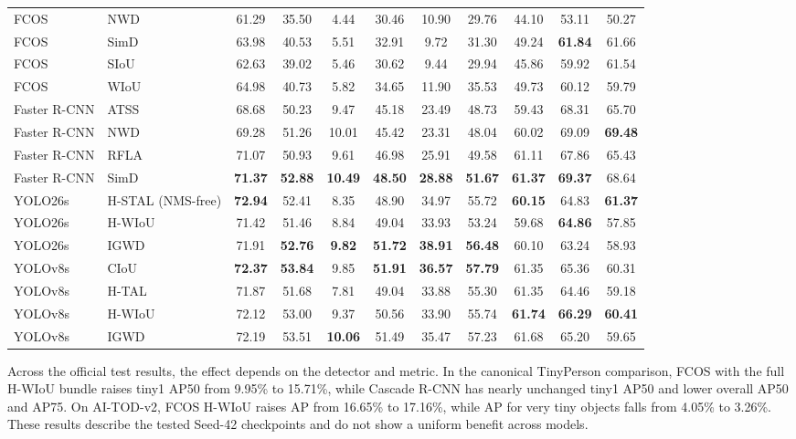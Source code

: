 \documentclass[11pt,a4paper]{article}
\providecommand{\midrule}{\hline}
\providecommand{\bottomrule}{\hline}
\begin{document}
\begin{table}[t]
{\begin{tabular}{llccccccccc}
    FCOS & NWD  & 61.29 & 35.50 & 4.44 & 30.46 & 10.90 & 29.76 & 44.10 & 53.11 & 50.27\\
    FCOS & SimD  & 63.98 & 40.53 & 5.51 & 32.91 & 9.72 & 31.30 & 49.24 & \textbf{61.84} & 61.66\\
    FCOS & SIoU  & 62.63 & 39.02 & 5.46 & 30.62 & 9.44 & 29.94 & 45.86 & 59.92 & 61.54\\
    FCOS & WIoU  & 64.98 & 40.73 & 5.82 & 34.65 & 11.90 & 35.53 & 49.73 & 60.12 & 59.79\\
    \midrule
    Faster R-CNN & ATSS  & 68.68 & 50.23 & 9.47 & 45.18 & 23.49 & 48.73 & 59.43 & 68.31 & 65.70\\
    Faster R-CNN & NWD  & 69.28 & 51.26 & 10.01 & 45.42 & 23.31 & 48.04 & 60.02 & 69.09 & \textbf{69.48}\\
    Faster R-CNN & RFLA  & 71.07 & 50.93 & 9.61 & 46.98 & 25.91 & 49.58 & 61.11 & 67.86 & 65.43\\
    Faster R-CNN & SimD  & \textbf{71.37} & \textbf{52.88} & \textbf{10.49} & \textbf{48.50} & \textbf{28.88} & \textbf{51.67} & \textbf{61.37} & \textbf{69.37} & 68.64\\
    \midrule
    YOLO26s & H-STAL (NMS-free)  & \textbf{72.94} & 52.41 & 8.35 & 48.90 & 34.97 & 55.72 & \textbf{60.15} & 64.83 & \textbf{61.37}\\
    YOLO26s & H-WIoU  & 71.42 & 51.46 & 8.84 & 49.04 & 33.93 & 53.24 & 59.68 & \textbf{64.86} & 57.85\\
    YOLO26s & IGWD  & 71.91 & \textbf{52.76} & \textbf{9.82} & \textbf{51.72} & \textbf{38.91} & \textbf{56.48} & 60.10 & 63.24 & 58.93\\
    \midrule
    YOLOv8s & CIoU  & \textbf{72.37} & \textbf{53.84} & 9.85 & \textbf{51.91} & \textbf{36.57} & \textbf{57.79} & 61.35 & 65.36 & 60.31\\
    YOLOv8s & H-TAL  & 71.87 & 51.68 & 7.81 & 49.04 & 33.88 & 55.30 & 61.35 & 64.46 & 59.18\\
    YOLOv8s & H-WIoU  & 72.12 & 53.00 & 9.37 & 50.56 & 33.90 & 55.74 & \textbf{61.74} & \textbf{66.29} & \textbf{60.41}\\
    YOLOv8s & IGWD  & 72.19 & 53.51 & \textbf{10.06} & 51.49 & 35.47 & 57.23 & 61.68 & 65.20 & 59.65\\
\bottomrule
\end{tabular}%
}\end{table}

Across the official test results, the effect depends on the detector and metric. In the canonical TinyPerson comparison, FCOS with the full H-WIoU bundle raises tiny1 AP50 from 9.95\% to 15.71\%, while Cascade R-CNN has nearly unchanged tiny1 AP50 and lower overall AP50 and AP75. On AI-TOD-v2, FCOS H-WIoU raises AP from 16.65\% to 17.16\%, while AP for very tiny objects falls from 4.05\% to 3.26\%. These results describe the tested Seed-42 checkpoints and do not show a uniform benefit across models.
\end{document}

